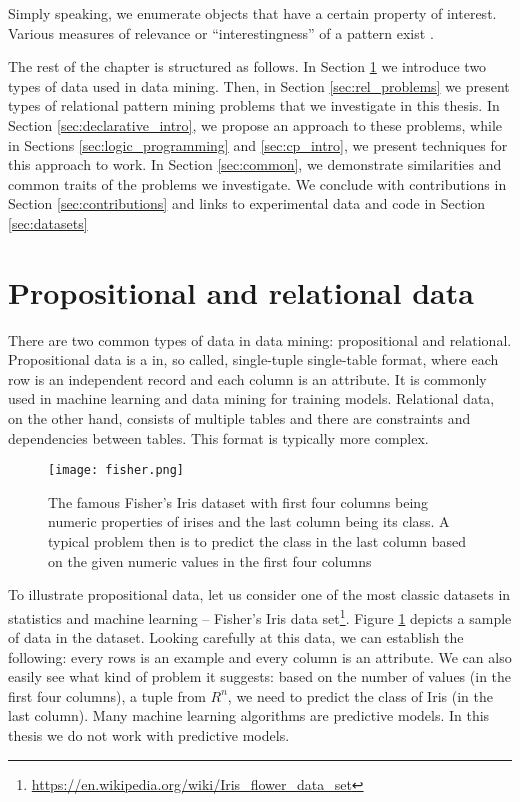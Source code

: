 Simply speaking, we enumerate objects that have a certain property of
interest. Various measures of relevance or ``interestingness'' of a pattern exist \parencite{tias_topk}.

The rest of the chapter is structured as follows. In Section
\ref{sec:data} we introduce two types of data used in data mining.
Then, in Section \ref{sec:rel_problems} we present types of relational pattern
mining problems that we investigate in this thesis. In Section
\ref{sec:declarative_intro}, we propose an approach to these problems,
while in Sections \ref{sec:logic_programming} and \ref{sec:cp_intro},
we present techniques for this approach to work. In Section
\ref{sec:common}, we demonstrate similarities and common traits of the
problems we investigate. We conclude with contributions in Section
\ref{sec:contributions} and links to experimental data and code in
Section \ref{sec:datasets}


\section{Propositional and relational data}\label{sec:data}
There are two common types of data in data mining: propositional and
relational. Propositional data is a in, so called, single-tuple
single-table format, where each row is an independent record and each
column is an attribute. It is commonly used in machine learning and data mining for training
models. Relational data, on the other hand, consists of  multiple
tables and there are constraints and dependencies between tables. This format is typically
more complex.

\pubrev
\begin{figure}[thb]
  \begin{center}
    \texttt{[image: fisher.png]}
  \end{center}
  \caption{The famous Fisher's Iris dataset with first four columns
    being numeric properties of irises and the last column being its
    class. A typical problem then is to predict the class in the last
    column based on the given numeric values in the first four columns}
  \label{fig:iris}
\end{figure}


To illustrate propositional data, let us consider one of the most
classic datasets in statistics and machine learning -- Fisher's Iris
data set\footnote{\url{https://en.wikipedia.org/wiki/Iris_flower_data_set}}.
Figure \ref{fig:iris} depicts a sample of data in the
dataset. Looking carefully at this data, we can establish the
following: every rows is an example and every column is an attribute.
We can also easily see what kind of problem it suggests:
based on the number of values (in the first four columns), a tuple from $R^n$, we need to predict
the class of Iris (in the last column). Many machine learning algorithms
are predictive models. In this thesis we do not work with predictive models.

